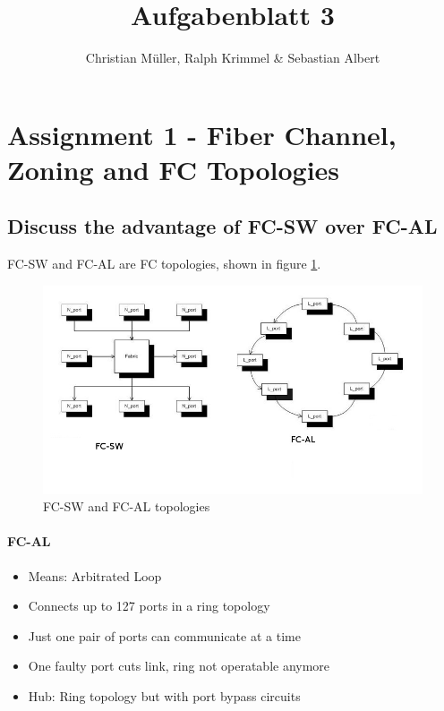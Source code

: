 \documentclass{article}
\title{Aufgabenblatt 3}
\author{Christian Müller, Ralph Krimmel \& Sebastian Albert }
\begin{document}
\maketitle

\section*{Assignment 1 - Fiber Channel, Zoning and FC Topologies}

\subsection{Discuss the advantage of FC-SW over FC-AL}
FC-SW and FC-AL are FC topologies, shown in figure \ref{fig:topo}.

\begin{figure}[h]
	\includegraphics[width=\textwidth]{fctopologies.jpg}
	\caption{FC-SW and FC-AL topologies}
	\label{fig:topo}
\end{figure}

\paragraph{FC-AL}
\begin{itemize}
	\item Means: Arbitrated Loop
	\item Connects up to 127 ports in a ring topology
	\item Just one pair of ports can communicate at a time
	\item One faulty port cuts link, ring not operatable anymore
	\item Hub: Ring topology  but with port bypass circuits
\end{itemize}
	
\end{document}
